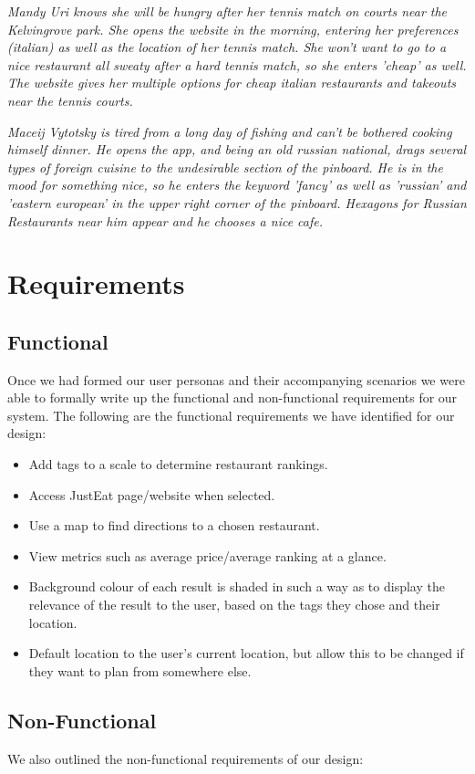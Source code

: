 \documentclass[10pt,a4paper]{article}
\begin{document}
\textit{Mandy Uri knows she will be hungry after her tennis match on courts near the Kelvingrove park. She opens the website in the morning, entering her preferences (italian) as well as the location of her tennis match. She won't want to go to a nice restaurant all sweaty after a hard tennis match, so she enters 'cheap' as well. The website gives her multiple options for cheap italian restaurants and takeouts near the tennis courts.}

\textit{Maceij Vytotsky is tired from a long day of fishing and can't be bothered cooking himself dinner. He opens the app, and being an old russian national, drags several types of foreign cuisine to the undesirable section of the pinboard. He is in the mood for something nice, so he enters the keyword 'fancy' as well as 'russian' and 'eastern european' in the upper right corner of the pinboard. Hexagons for Russian Restaurants near him appear and he chooses a nice cafe.}

\section*{Requirements}
\subsection*{Functional}
Once we had formed our user personas and their accompanying scenarios we were able to formally write up the functional and non-functional requirements for our system. The following are the functional requirements we have identified for our design:

\begin{itemize}
	\item Add tags to a scale to determine restaurant rankings.
	\item Access JustEat page/website when selected.
	\item Use a map to find directions to a chosen restaurant.
	\item View metrics such as average price/average ranking at a glance.
	\item Background colour of each result is shaded in such a way as to display the relevance of the result to the user, based on the tags they chose and their location.
	\item Default location to the user's current location, but allow this to be changed if they want to plan from somewhere else.
\end{itemize}
	
\subsection*{Non-Functional}
We also outlined the non-functional requirements of our design:
\end{document}
